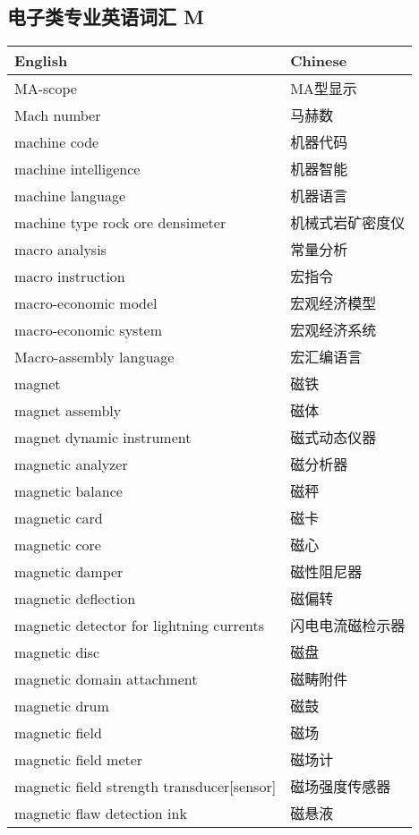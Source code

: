 \documentclass[
]{article}
\begin{document}
\hypertarget{ux7535ux5b50ux7c7bux4e13ux4e1aux82f1ux8bedux8bcdux6c47-m}{%
\subsection{电子类专业英语词汇
M}\label{ux7535ux5b50ux7c7bux4e13ux4e1aux82f1ux8bedux8bcdux6c47-m}}

\begin{longtable}[]{@{}ll@{}}
\toprule()
English & Chinese \\
\midrule()
\endhead
MA-scope & MA型显示 \\
Mach number & 马赫数 \\
machine code & 机器代码 \\
machine intelligence & 机器智能 \\
machine language & 机器语言 \\
machine type rock ore densimeter & 机械式岩矿密度仪 \\
macro analysis & 常量分析 \\
macro instruction & 宏指令 \\
macro-economic model & 宏观经济模型 \\
macro-economic system & 宏观经济系统 \\
Macro-assembly language & 宏汇编语言 \\
magnet & 磁铁 \\
magnet assembly & 磁体 \\
magnet dynamic instrument & 磁式动态仪器 \\
magnetic analyzer & 磁分析器 \\
magnetic balance & 磁秤 \\
magnetic card & 磁卡 \\
magnetic core & 磁心 \\
magnetic damper & 磁性阻尼器 \\
magnetic deflection & 磁偏转 \\
magnetic detector for lightning currents & 闪电电流磁检示器 \\
magnetic disc & 磁盘 \\
magnetic domain attachment & 磁畴附件 \\
magnetic drum & 磁鼓 \\
magnetic field & 磁场 \\
magnetic field meter & 磁场计 \\
magnetic field strength transducer{[}sensor{]} & 磁场强度传感器 \\
magnetic flaw detection ink & 磁悬液 \\

\end{longtable}
\end{document}
